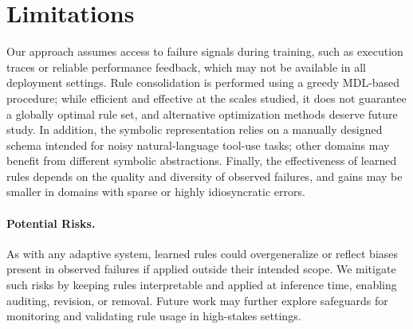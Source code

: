 \section{Limitations}

Our approach assumes access to failure signals during training, such as execution traces or
reliable performance feedback, which may not be available in all deployment settings. Rule
consolidation is performed using a greedy MDL-based procedure; while efficient and effective
at the scales studied, it does not guarantee a globally optimal rule set, and alternative
optimization methods deserve future study.
In addition, the symbolic representation relies on a manually designed
schema intended for noisy natural-language tool-use tasks; other domains may benefit from
different symbolic abstractions. 
Finally, the effectiveness
of learned rules depends on the quality and diversity of observed failures, and gains may be
smaller in domains with sparse or highly idiosyncratic errors.

\paragraph{Potential Risks.}
As with any adaptive system, learned rules could overgeneralize or reflect biases present in
observed failures if applied outside their intended scope. We mitigate such risks by keeping
rules interpretable and applied at inference time, enabling auditing, revision, or removal.
Future work may further explore safeguards for monitoring and validating rule usage in
high-stakes settings.
